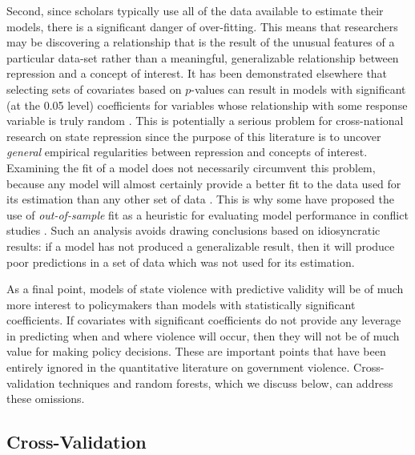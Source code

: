 \documentclass[12pt]{article}
\begin{document}
Second, since scholars typically use all of the data available to estimate their models, there is a significant danger of over-fitting. This means that researchers may be discovering a relationship that is the result of the unusual features of a particular data-set rather than a meaningful, generalizable relationship between repression and a concept of interest. It has been demonstrated elsewhere that selecting sets of covariates based on $p$-values can result in models with significant (at the 0.05 level) coefficients for variables whose relationship with some response variable is truly random \citep{Freedman1983}. This is potentially a serious problem for cross-national research on state repression since the purpose of this literature is to uncover {\em general} empirical regularities between repression and concepts of interest. Examining the fit of a model does not necessarily circumvent this problem, because any model will almost certainly provide a better fit to the data used for its estimation than any other set of data \citep[See, e.g.][]{PicardCook1984}. This is why some have proposed the use of {\em out-of-sample} fit as a heuristic for evaluating model performance in conflict studies \citep{BeckKingZeng2000,Wardetal2010}. Such an analysis avoids drawing conclusions based on idiosyncratic results: if a model has not produced a generalizable result, then it will produce poor predictions in a set of data which was not used for its estimation. 

As a final point, models of state violence with predictive validity will be of much more interest to policymakers than models with statistically significant coefficients. If covariates with significant coefficients do not provide any leverage in predicting when and where violence will occur, then they will not be of much value for making policy decisions. These are important points that have been entirely ignored in the quantitative literature  on government violence. Cross-validation techniques and random forests, which we discuss below, can address these omissions.

\subsection{Cross-Validation}
\end{document}
